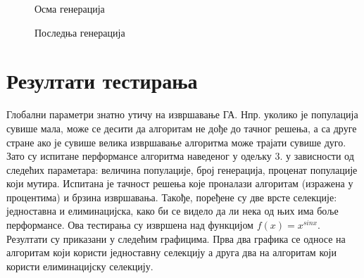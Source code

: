 \documentclass{article}
\begin{document}
\begin{figure}[H]
    \centering

    \caption{Осма генерација}
\end{figure}

\begin{figure}[H]
    \centering

    \caption{Последња генерација}
\end{figure}

\section{Резултати тестирања}
Глобални параметри знатно утичу на извршавање ГА. Нпр. уколико је популација сувише мала,
може се десити да алгоритам не дође до тачног решења, а са друге стране ако је сувише велика
извршавање алгоритма може трајати сувише дуго. Зато су испитане перформансе алгоритма наведеног
у одељку 3. у зависности од следећих параметара: величина популације, број генерација, проценат 
популације који мутира. Испитана је тачност решења које проналази алгоритам (изражена у процентима)
и брзина извршавања. Такође, поређене су две врсте селекције: једноставна и елиминацијска, како би
се видело да ли нека од њих има боље перформансе. Ова тестирања су извршена над функцијом $f(x) = x^{sin x}$.
Резултати су приказани у следећим графицима. Прва два графика се односе на алгоритам који користи једноставну селекцију
а друга два на алгоритам који користи елиминацијску селекцију.
\end{document}
